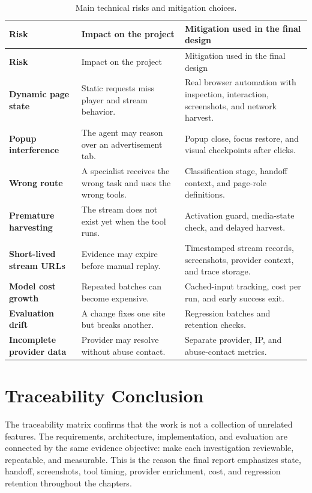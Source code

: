 \begin{longtable}{>{\raggedright\arraybackslash\bfseries}p{3.4cm}
                  >{\raggedright\arraybackslash}p{4.5cm}
                  >{\raggedright\arraybackslash}p{5.6cm}}
\caption{Main technical risks and mitigation choices.}
\label{tab:risk-traceability}\\
\toprule
\rowcolor{accent!8}
Risk & Impact on the project & Mitigation used in the final design \\
\midrule
\endfirsthead
\toprule
\rowcolor{accent!8}
Risk & Impact on the project & Mitigation used in the final design \\
\midrule
\endhead
\bottomrule
\endfoot
Dynamic page state & Static requests miss player and stream behavior. & Real
browser automation with inspection, interaction, screenshots, and network
harvest. \\
Popup interference & The agent may reason over an advertisement tab. & Popup
close, focus restore, and visual checkpoints after clicks. \\
Wrong route & A specialist receives the wrong task and uses the wrong tools. &
Classification stage, handoff context, and page-role definitions. \\
Premature harvesting & The stream does not exist yet when the tool runs. &
Activation guard, media-state check, and delayed harvest. \\
Short-lived stream URLs & Evidence may expire before manual replay. &
Timestamped stream records, screenshots, provider context, and trace storage. \\
Model cost growth & Repeated batches can become expensive. & Cached-input
tracking, cost per run, and early success exit. \\
Evaluation drift & A change fixes one site but breaks another. & Regression
batches and retention checks. \\
Incomplete provider data & Provider may resolve without abuse contact. &
Separate provider, IP, and abuse-contact metrics. \\
\end{longtable}

\section{Traceability Conclusion}

The traceability matrix confirms that the work is not a collection of unrelated
features. The requirements, architecture, implementation, and evaluation are
connected by the same evidence objective: make each investigation reviewable,
repeatable, and measurable. This is the reason the final report emphasizes
state, handoff, screenshots, tool timing, provider enrichment, cost, and
regression retention throughout the chapters.
